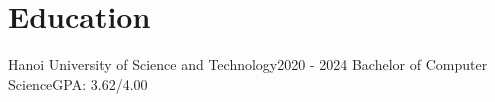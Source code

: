 \section{Education}
    \resumeSubHeadingListStart

    \resumeSubheading
    {Hanoi University of Science and Technology}{2020 - 2024}
    {Bachelor of Computer Science}{GPA: 3.62/4.00}

    \resumeSubHeadingListEnd